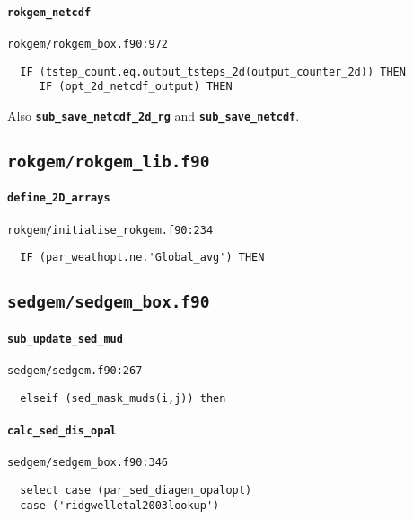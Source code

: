 \documentclass[a4paper,10pt,article]{memoir}
\begin{document}
\paragraph{\texttt{rokgem\_netcdf}}

\texttt{rokgem/rokgem\_box.f90:972}

\begin{verbatim}
  IF (tstep_count.eq.output_tsteps_2d(output_counter_2d)) THEN
     IF (opt_2d_netcdf_output) THEN
\end{verbatim}

Also \textbf{\texttt{sub\_save\_netcdf\_2d\_rg}} and
\textbf{\texttt{sub\_save\_netcdf}}.


\subsection*{\texttt{rokgem/rokgem\_lib.f90}}

\paragraph{\texttt{define\_2D\_arrays}}

\texttt{rokgem/initialise\_rokgem.f90:234}

\begin{verbatim}
  IF (par_weathopt.ne.'Global_avg') THEN
\end{verbatim}


\subsection*{\texttt{sedgem/sedgem\_box.f90}}

\paragraph{\texttt{sub\_update\_sed\_mud}}

\texttt{sedgem/sedgem.f90:267}

\begin{verbatim}
  elseif (sed_mask_muds(i,j)) then
\end{verbatim}

\paragraph{\texttt{calc\_sed\_dis\_opal}}

\texttt{sedgem/sedgem\_box.f90:346}

\begin{verbatim}
  select case (par_sed_diagen_opalopt)
  case ('ridgwelletal2003lookup')
\end{verbatim}
\end{document}
